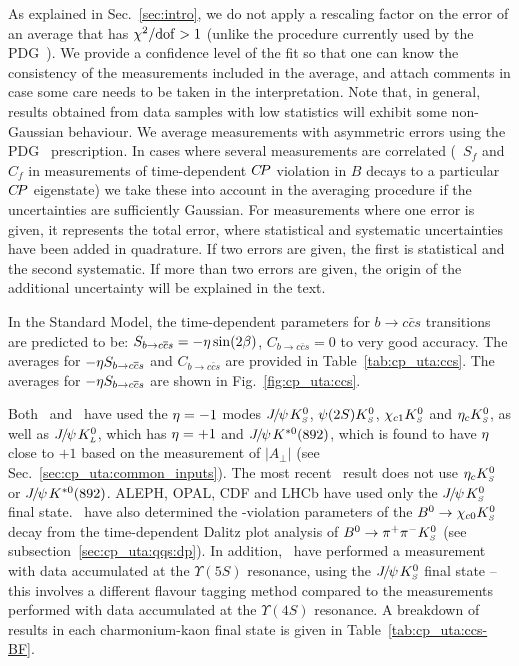 As explained in Sec.~\ref{sec:intro},
we do not apply a rescaling factor on the error of an average
that has $\chi^2/{\rm dof} > 1$ 
(unlike the procedure currently used by the PDG~\cite{PDG_2014}).
We provide a confidence level of the fit so that
one can know the consistency of the measurements included in the average,
and attach comments in case some care needs to be taken in the interpretation.
Note that, in general, results obtained from data samples with low statistics
will exhibit some non-Gaussian behaviour.
We average measurements with asymmetric errors 
using the PDG~\cite{PDG_2014} prescription.
In cases where several measurements are correlated
(\eg\ $S_f$ and $C_f$ in measurements of time-dependent $C\!P$ violation
in $B$ decays to a particular $C\!P$ eigenstate)
we take these into account in the averaging procedure
if the uncertainties are sufficiently Gaussian.
For measurements where one error is given, 
it represents the total error, 
where statistical and systematic uncertainties have been added in quadrature.
If two errors are given, the first is statistical and the second systematic.
If more than two errors are given,
the origin of the additional uncertainty will be explained in the text.

\clearpage
{}
\label{sec:cp_uta:ccs}

\label{sec:cp_uta:ccs:cp_eigen}

In the Standard Model, the time-dependent parameters for
$b \to c\bar c s$ transitions are predicted to be: 
$S_{b \to c\bar c s} = - \etacp \sin(2\beta)$,
$C_{b \to c\bar c s} = 0$ to very good accuracy.
The averages for $-\etacp S_{b \to c\bar c s}$ and $C_{b \to c\bar c s}$
are provided in Table~\ref{tab:cp_uta:ccs}.
The averages for $-\etacp S_{b \to c\bar c s}$ 
are shown in Fig.~\ref{fig:cp_uta:ccs}.

Both \babar\  and \belle\ have used the ${\eta} = -1$ modes
${J\mskip -3mu/\mskip -2mu\psi\mskip 2mu} K^0_{\scriptscriptstyle S}$, $\psi(2S) K^0_{\scriptscriptstyle S}$, $\chi_{c1} K^0_{\scriptscriptstyle S}$ and $\eta_c K^0_{\scriptscriptstyle S}$, 
as well as ${J\mskip -3mu/\mskip -2mu\psi\mskip 2mu} K^0_{\scriptscriptstyle L}$, which has ${\eta} = +1$
and ${J\mskip -3mu/\mskip -2mu\psi\mskip 2mu} K^{*0}(892)$, which is found to have ${\eta}$ close to $+1$
based on the measurement of $\left| A_\perp \right|$ 
(see Sec.~\ref{sec:cp_uta:common_inputs}).
The most recent \belle\ result does not use $\eta_c K^0_{\scriptscriptstyle S}$ or ${J\mskip -3mu/\mskip -2mu\psi\mskip 2mu} K^{*0}(892)$.
ALEPH, OPAL, CDF and LHCb have used only the ${J\mskip -3mu/\mskip -2mu\psi\mskip 2mu} K^0_{\scriptscriptstyle S}$ final state.
\babar\ have also determined the \CP-violation parameters of the
$B^0\to\chi_{c0} K^0_{\scriptscriptstyle S}$ decay from the time-dependent Dalitz plot analysis of
$B^0 \to \pi^+\pi^-K^0_{\scriptscriptstyle S}$ (see subsection~\ref{sec:cp_uta:qqs:dp}).
In addition, \belle\ have performed a measurement with data accumulated at the $\Upsilon(5S)$ resonance, using the ${J\mskip -3mu/\mskip -2mu\psi\mskip 2mu}K^0_{\scriptscriptstyle S}$ final state -- this involves a different flavour tagging method compared to the measurements performed with data accumulated at the $\Upsilon(4S)$ resonance.
A breakdown of results in each charmonium-kaon final state is given in 
Table~\ref{tab:cp_uta:ccs-BF}.

